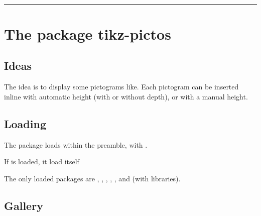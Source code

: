 \documentclass[english,11pt,a4paper]{article}
\begin{document}
\vfill~

\pagebreak


\hypertarget{matoc}{}

\tableofcontents

\vspace*{5mm}

\hrule

\vspace*{5mm}

\section{The package tikz-pictos}

\subsection{Ideas}

The idea is to display some pictograms like. Each pictogram can be inserted inline with automatic height (with or without depth), or with a manual height.

\subsection{Loading}

The package loads within the preamble, with .

If  is loaded, it load itself 

The only loaded packages are , , , , ,  and  (with  libraries).

\begin{codehigh}[language=latex/latex2,style/main=cyan!10,style/code=cyan!10]
\usepackage{customenvs-tikzpictos}
\end{codehigh}

\subsection{Gallery}
\end{document}
